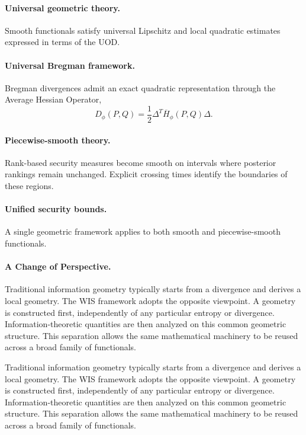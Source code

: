 \paragraph{Universal geometric theory.}
Smooth functionals satisfy universal Lipschitz and local quadratic
estimates expressed in terms of the UOD.

\paragraph{Universal Bregman framework.}
Bregman divergences admit an exact quadratic representation through the
Average Hessian Operator,
\[ D_\phi(P,Q) = \frac12 \Delta^{T}
\overline H_\phi(P,Q) \Delta. \]

\paragraph{Piecewise-smooth theory.}
Rank-based security measures become smooth on intervals where posterior
rankings remain unchanged.  Explicit crossing times identify the
boundaries of these regions.

\paragraph{Unified security bounds.}
A single geometric framework applies to both smooth and piecewise-smooth
functionals.

\paragraph{A Change of Perspective.}
Traditional information geometry typically starts from a divergence and
derives a local geometry.  The WIS framework adopts the opposite
viewpoint.  A geometry is constructed first, independently of any
particular entropy or divergence.  Information-theoretic quantities are
then analyzed on this common geometric structure.  This separation
allows the same mathematical machinery to be reused across a broad
family of functionals.



Traditional information geometry typically starts from a divergence and
derives a local geometry.  The WIS framework adopts the opposite
viewpoint.  A geometry is constructed first, independently of any
particular entropy or divergence.  Information-theoretic quantities are
then analyzed on this common geometric structure.  This separation
allows the same mathematical machinery to be reused across a broad
family of functionals.

